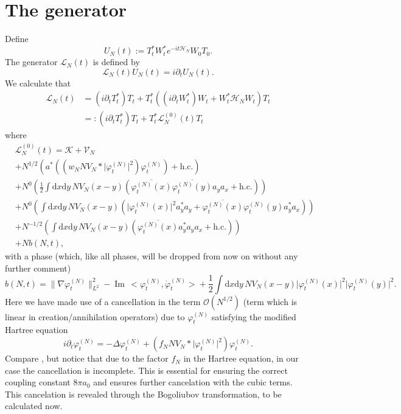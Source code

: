 \documentclass[11pt,a4paper]{scrartcl}
\newcommand{\di}{\textrm{d}}		%
\newcommand{\Lcal}{\mathcal{L}}		%
\newcommand{\Kcal}{\mathcal{K}}		%
\newcommand{\Vcal}{\mathcal{V}}		%
\newcommand{\Hcal}{\mathcal{H}}		%
\newcommand{\Ocal}{\mathcal{O}}		%
\newcommand{\hc}{\mbox{h.c.}}		%
\newcommand{\scal}[2]{\big<#1,#2\big>} %
\newcommand{\cc}[1]{\overline{#1}}	%
\renewcommand{\Im}{\operatorname{Im}\,} 	%
\newcommand{\norm}[1]{\lVert#1\rVert}	%
\newcommand{\ph}{\varphi_t^{(N)}}	%
\newcommand{\phdot}{\dot{\varphi}_t^{(N)}}	%
\newcommand{\bd}{\begin{displaymath}}			%
\newcommand{\ed}{\end{displaymath}}
\begin{document}
\section{The generator}
Define
\bd
U_N(t) := T^\ast_t W^\ast_t e^{-it \Hcal_N} W_0 T_0.
\ed
The generator $\Lcal_N(t)$ is defined by
\bd
\Lcal_N(t) U_N(t) = i \partial_t U_N(t).
\ed
We calculate that
\begin{align*}
\Lcal_N(t) 	& = (i \partial_t T^*_t) T_t + T^*_t \left( (i \partial_t W^*_t) W_t + W^*_t \Hcal_N W_t \right) T_t \\
		& =: (i \partial_t T^*_t) T_t + T^*_t \Lcal^{(0)}_N(t) T_t
\end{align*}
where
\begin{align*}
& \Lcal^{(0)}_N(t) = \Kcal + \Vcal_N \\
		& + N^{1/2} \left(  a^*\left( (w_N N V_N \ast \lvert \ph \rvert^2)\ph \right) + \hc  \right) \\
		& + N^0	    \left(  \frac{1}{2}\int \di x \di y\, NV_N(x-y)\left( \cc{\ph(x)} \cc{\ph(y)} a_y a_x + \hc \right) \right) \\
		& + N^0	    \left(  \int \di x \di y\, NV_N(x-y)\left( \lvert \ph(x) \rvert^2 a^*_y a_y + \cc{\ph(x)} \ph(y) a^*_y a_x \right) \right) \\
		& + N^{-1/2}\left(  \int \di x \di y\, NV_N(x-y) \left( \cc{\ph(x)} a^*_y a_y a_x + \hc \right)  \right) \\
		& + N b(N,t),
\end{align*}
with a phase (which, like all phases, will be dropped from now on without any further comment)
\bd
b(N,t) = \norm{\nabla \ph}_{L^2}^2 - \Im \scal{\ph}{\phdot} + \frac{1}{2}\int \di x \di y\, NV_N(x-y) \lvert \ph(x)\rvert^2 \lvert \ph(y) \rvert^2.
\ed
Here we have made use of a cancellation in the term $\Ocal({N^{1/2}})$ (term which is linear in creation/annihilation operators) due to $\ph$ satisfying the modified Hartree equation
\bd
i\partial_t \ph = -\Delta \ph + \left(f_N N V_N \ast \lvert \ph \rvert^2 \right) \ph.
\ed
Compare \cite{RS2009}, but notice that due to the factor $f_N$ in the Hartree equation, in our case the cancellation is incomplete. This is essential for ensuring the correct coupling constant $8\pi a_0$ and ensures further cancelation with the cubic terms. This cancelation is revealed through the Bogoliubov transformation, to be calculated now.
\end{document}

